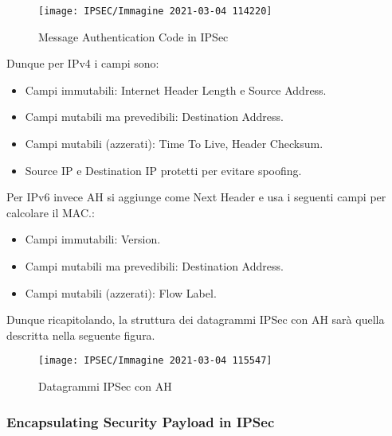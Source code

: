 \documentclass[14pt]{extreport}
\begin{document}
\begin{figure}[H]
    \centering
    \texttt{[image: IPSEC/Immagine 2021-03-04 114220]}
    \caption{Message Authentication Code in IPSec}
    \label{IPSEC9}
\end{figure}

Dunque per IPv4 i campi sono:


\begin{itemize}
    \item Campi immutabili: Internet Header Length e Source Address.
    
    \item Campi mutabili ma prevedibili: Destination Address.
    
    \item Campi mutabili (azzerati): Time To Live, Header Checksum.
    
    \item Source IP e Destination IP protetti per evitare spoofing.
\end{itemize}



Per IPv6 invece AH si aggiunge come Next Header e usa i seguenti campi per calcolare il MAC.:


\begin{itemize}
    \item Campi immutabili: Version.
    
    \item Campi mutabili ma prevedibili: Destination Address.
    
    \item Campi mutabili (azzerati): Flow Label.
\end{itemize}




Dunque ricapitolando, la struttura dei datagrammi IPSec con AH sarà quella descritta nella seguente figura.



\begin{figure}[H]
    \centering
    \texttt{[image: IPSEC/Immagine 2021-03-04 115547]}
    \caption{Datagrammi IPSec con AH}
    \label{IPSEC10}
\end{figure}












\subsubsection{Encapsulating Security Payload in IPSec}
\end{document}
